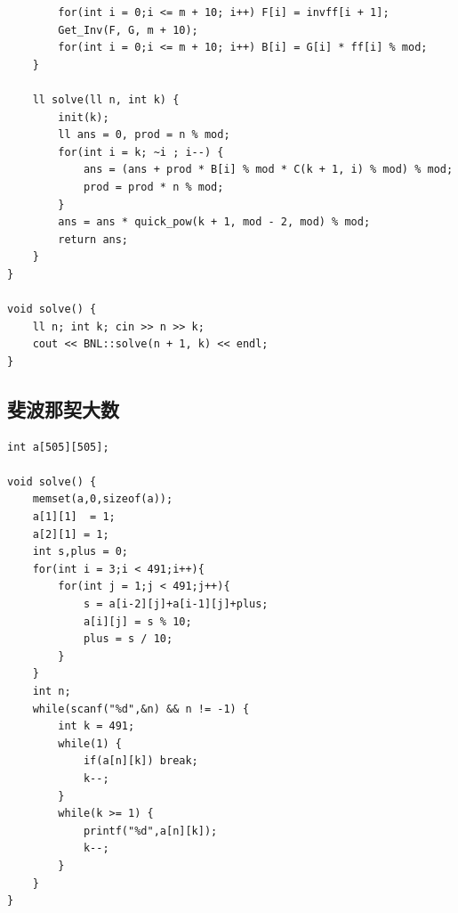 \documentclass[twoside]{article}
\begin{document}
\begin{lstlisting}
        for(int i = 0;i <= m + 10; i++) F[i] = invff[i + 1];
        Get_Inv(F, G, m + 10);
        for(int i = 0;i <= m + 10; i++) B[i] = G[i] * ff[i] % mod;
    }

    ll solve(ll n, int k) {
        init(k);
        ll ans = 0, prod = n % mod;
        for(int i = k; ~i ; i--) {
            ans = (ans + prod * B[i] % mod * C(k + 1, i) % mod) % mod;
            prod = prod * n % mod;
        }
        ans = ans * quick_pow(k + 1, mod - 2, mod) % mod;
        return ans;
    }
}

void solve() {
    ll n; int k; cin >> n >> k;
    cout << BNL::solve(n + 1, k) << endl;
}\end{lstlisting}
\subsection{斐波那契大数}
\begin{lstlisting}
int a[505][505];

void solve() {
    memset(a,0,sizeof(a));
    a[1][1]  = 1;
    a[2][1] = 1;
    int s,plus = 0;
    for(int i = 3;i < 491;i++){
        for(int j = 1;j < 491;j++){
            s = a[i-2][j]+a[i-1][j]+plus;
            a[i][j] = s % 10;
            plus = s / 10;
        }
    }
    int n;
    while(scanf("%d",&n) && n != -1) {
        int k = 491;
        while(1) {
            if(a[n][k]) break;
            k--;
        }
        while(k >= 1) {
            printf("%d",a[n][k]);
            k--;
        }
    }
}\end{lstlisting}
\end{document}
